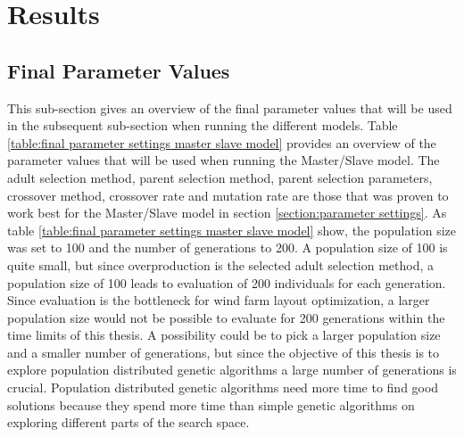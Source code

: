 \section{Results}\label{section:results}


\subsection{Final Parameter Values}\label{subsection:final parameter values}
This sub-section gives an overview of the final parameter values that will be used in the subsequent sub-section when running the different models. Table \ref{table:final parameter settings master slave model} provides an overview of the parameter values that will be used when running the Master/Slave model. The adult selection method, parent selection method, parent selection parameters, crossover method, crossover rate and mutation rate are those that was proven to work best for the Master/Slave model in section \ref{section:parameter settings}. As table \ref{table:final parameter settings master slave model} show, the population size was set to 100 and the number of generations to 200. A population size of 100 is quite small, but since overproduction is the selected adult selection method, a population size of 100 leads to evaluation of 200 individuals for each generation. Since evaluation is the bottleneck for wind farm layout optimization, a larger population size would not be possible to evaluate for 200 generations within the time limits of this thesis. A possibility could be to pick a larger population size and a smaller number of generations, but since the objective of this thesis is to explore population distributed genetic algorithms a large number of generations is crucial. Population distributed genetic algorithms need more time to find good solutions because they spend more time than simple genetic algorithms on exploring different parts of the search space.\\

